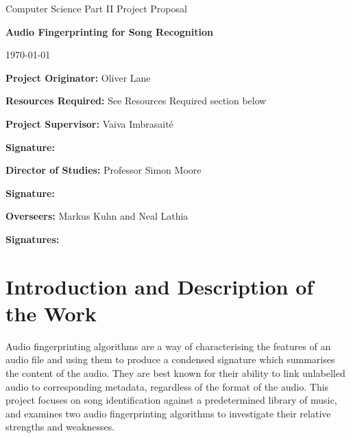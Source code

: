 \documentclass[12pt]{article}
\begin{document}
\thispagestyle{empty}

\medskip
{}
\medskip
{}

\vfil

\centerline{\large Computer Science Part II Project Proposal}
\vspace{0.4in}
\centerline{\Large\bf Audio Fingerprinting for Song Recognition}
\vspace{0.3in}
\centerline{\large \today}

\vfil

{\bf Project Originator:} Oliver Lane

\vspace{0.1in}

{\bf Resources Required:} See Resources Required section below

\vspace{0.5in}

{\bf Project Supervisor:} Vaiva Imbrasait\'{e}

\vspace{0.2in}

{\bf Signature:}

\vspace{0.5in}

{\bf Director of Studies:}  Professor Simon Moore

\vspace{0.2in}

{\bf Signature:}

\vspace{0.5in}

{\bf Overseers:} Markus Kuhn and Neal Lathia

\vspace{0.2in}

{\bf Signatures:} 

\vfil
\eject


\section*{Introduction and Description of the Work}

Audio fingerprinting algorithms are a way of characterising the features of an audio file and using them to produce a condensed signature which summarises the content of the audio. They are best known for their ability to link unlabelled audio to corresponding metadata, regardless of the format of the audio. This project focuses on song identification against a predetermined library of music, and examines two audio fingerprinting algorithms to investigate their relative strengths and weaknesses.
\end{document}
